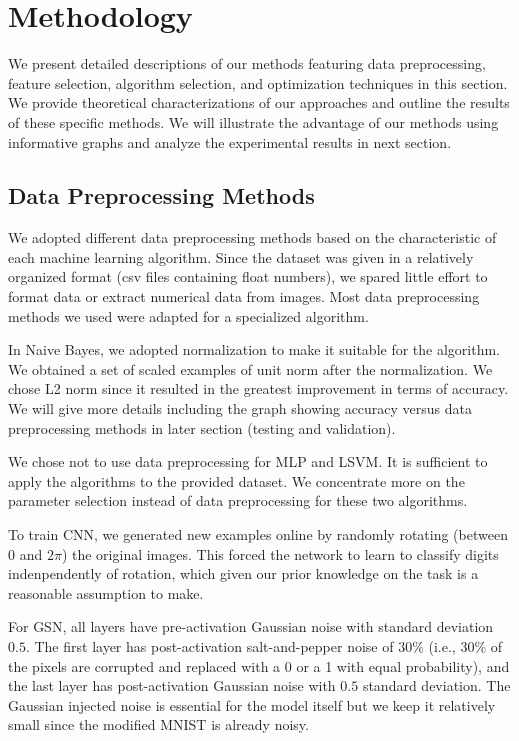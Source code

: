 \documentclass{acm_proc_article-sp}
\begin{document}
\section{Methodology}
We present detailed descriptions of our methods featuring data preprocessing, feature selection, algorithm selection, and optimization techniques in this section.  We provide theoretical characterizations of our approaches and outline the results of these specific methods. We will illustrate the advantage of our methods using informative graphs and analyze the experimental results in next section.


\subsection{Data Preprocessing Methods}
We adopted different data preprocessing methods based on the characteristic of each machine learning algorithm. Since the dataset was given in a relatively organized format (csv files containing float numbers), we spared little effort to format data or extract numerical data from images. Most data preprocessing methods we used were adapted for a specialized algorithm.

In Naive Bayes, we adopted normalization to  make it suitable for the algorithm. We obtained a set of scaled examples of unit norm after the normalization. We chose L2 norm since it resulted in the greatest improvement in terms of accuracy. We will give more details including the graph showing accuracy versus data preprocessing methods in later section (testing and validation).

We chose not to use data preprocessing for MLP and LSVM. It is sufficient to apply the algorithms to the provided dataset. We concentrate more on the parameter selection instead of data preprocessing for these two algorithms.

To train CNN, we generated new examples online by randomly rotating (between 0 and $2\pi$) the original images. This forced the network to learn to classify digits indenpendently of rotation, which given our prior knowledge on the task is a reasonable assumption to make.

For GSN, all layers have pre-activation Gaussian noise with standard deviation $0.5$. The first layer has post-activation salt-and-pepper noise of $30\%$ (i.e., $30\%$ of the pixels are corrupted and replaced with a 0 or a 1 with equal probability), and the last layer has post-activation Gaussian noise with $0.5$ standard deviation. The Gaussian injected noise is essential for the model itself but we keep it relatively small since the modified MNIST is already noisy. 
\end{document}
